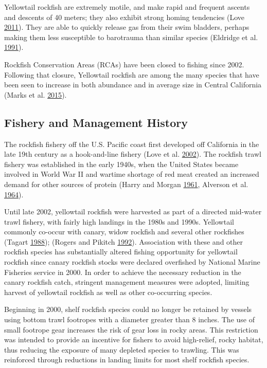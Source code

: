 \documentclass[12pt,]{article}
\begin{document}
Yellowtail rockfish are extremely motile, and make rapid and frequent
ascents and descents of 40 meters; they also exhibit strong homing
tendencies (Love \protect\hyperlink{ref-Love2011}{2011}). They are able
to quickly release gas from their swim bladders, perhaps making them
less susceptible to barotrauma than similar species (Eldridge et al.
\protect\hyperlink{ref-Eldridge1991}{1991}).

Rockfish Conservation Areas (RCAs) have been closed to fishing since
2002. Following that closure, Yellowtail rockfish are among the many
species that have been seen to increase in both abundance and in average
size in Central California (Marks et al.
\protect\hyperlink{ref-Marks2015}{2015}).

\subsection{Fishery and Management
History}\label{fishery-and-management-history}

The rockfish fishery off the U.S. Pacific coast first developed off
California in the late 19th century as a hook-and-line fishery (Love et
al. \protect\hyperlink{ref-Love2002}{2002}). The rockfish trawl fishery
was established in the early 1940s, when the United States became
involved in World War II and wartime shortage of red meat created an
increased demand for other sources of protein (Harry and Morgan
\protect\hyperlink{ref-Harry1961}{1961}, Alverson et al.
\protect\hyperlink{ref-Alverson1964}{1964}).

Until late 2002, yellowtail rockfish were harvested as part of a
directed mid-water trawl fishery, with fairly high landings in the 1980s
and 1990s. Yellowtail commonly co-occur with canary, widow rockfish and
several other rockfishes (Tagart
\protect\hyperlink{ref-Tagart1988}{1988}); (Rogers and Pikitch
\protect\hyperlink{ref-Rogers1992}{1992}). Association with these and
other rockfish species has substantially altered fishing opportunity for
yellowtail rockfish since canary rockfish stocks were declared
overfished by National Marine Fisheries service in 2000. In order to
achieve the necessary reduction in the canary rockfish catch, stringent
management measures were adopted, limiting harvest of yellowtail
rockfish as well as other co-occurring species.

Beginning in 2000, shelf rockfish species could no longer be retained by
vessels using bottom trawl footropes with a diameter greater than 8
inches. The use of small footrope gear increases the risk of gear loss
in rocky areas. This restriction was intended to provide an incentive
for fishers to avoid high-relief, rocky habitat, thus reducing the
exposure of many depleted species to trawling. This was reinforced
through reductions in landing limits for most shelf rockfish species.
\end{document}
